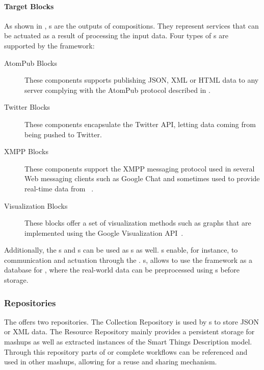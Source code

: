 \paragraph{Target Blocks}
As shown in , s are the outputs of compositions. They represent services that can be actuated as a result of processing the input data. Four types of s are supported by the framework:
\begin{description}
 \item[AtomPub Blocks] These components supports publishing JSON, XML or HTML data to any server complying with the AtomPub protocol described in . 

 \item[Twitter Blocks] These components encapsulate the Twitter API, letting data coming from \sts{} being pushed to Twitter.

 \item[XMPP Blocks] These components support the XMPP messaging protocol used in several Web messaging clients such as Google Chat and sometimes used to provide real-time data from \sts{}~\cite{Hornsby2010,Hornsby2009}.

 \item[Visualization Blocks] These blocks offer a set of visualization methods such as graphs that are implemented using the Google Visualization API~.
 \end{description}

Additionally, the s and s can be used as s as well. s enable, for instance, \sts{} to \sts{} communication and actuation through the \pMashupsFw{}. s, allows to use the framework as a database for \sts{}, where the real-world data can be preprocessed using s before storage.

\subsubsection{Repositories}
The \pMashupsFw{} offers two repositories. The Collection Repository is used by s to store JSON or XML data.
The Resource Repository mainly provides a persistent storage for mashups as well as extracted instances of the Smart Things Description model. Through this repository parts of or complete workflows can be referenced and used in other mashups, allowing for a reuse and sharing mechanism.

